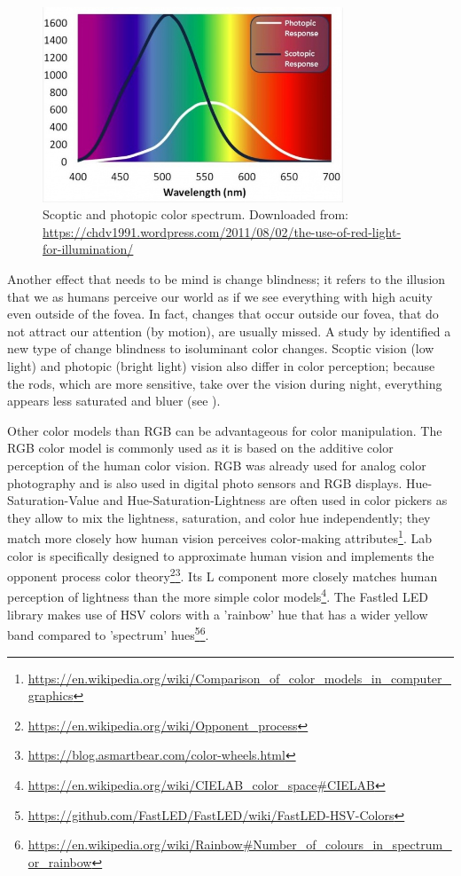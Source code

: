 \begin{figure}
    \includegraphics[width=0.8\textwidth]{fig/scoptic.jpg}
    \caption[Color spectrum]{Scoptic and photopic color spectrum. Downloaded from: \url{https://chdv1991.wordpress.com/2011/08/02/the-use-of-red-light-for-illumination/}}
    \label{fig:spectrum}
\end{figure}
Another effect that needs to be mind is change blindness; it refers to the illusion that we as humans perceive our world as if we see everything with high acuity even outside of the fovea. In fact, changes that occur outside our fovea, that do not attract our attention (by motion), are usually missed. A study by \citet{Goddard2013AScale} identified a new type of change blindness to isoluminant color changes. Scoptic vision (low light) and photopic (bright light) vision also differ in color perception; because the rods, which are more sensitive, take over the vision during night, everything appears less saturated and bluer (see \emph{}).

Other color models than RGB can be advantageous for color manipulation. The RGB color model is commonly used as it is based on the additive color perception of the human color vision. RGB was already used for analog color photography and is also used in digital photo sensors and RGB displays. Hue-Saturation-Value and Hue-Saturation-Lightness are often used in color pickers as they allow to mix the lightness, saturation, and color hue independently; they match more closely how human vision perceives color-making attributes\footnote{\url{https://en.wikipedia.org/wiki/Comparison_of_color_models_in_computer_graphics}}. Lab color is specifically designed to approximate human vision and implements the  opponent process color theory\footnote{\url{https://en.wikipedia.org/wiki/Opponent_process}}\fnsep\footnote{\url{https://blog.asmartbear.com/color-wheels.html}}. Its L component more closely matches human perception of lightness than the more simple color models\footnote{\url{https://en.wikipedia.org/wiki/CIELAB_color_space\#CIELAB}}. The Fastled LED library makes use of HSV colors with a 'rainbow' hue that has a wider yellow band compared to 'spectrum' hues\footnote{\url{https://github.com/FastLED/FastLED/wiki/FastLED-HSV-Colors}}\fnsep\footnote{\url{https://en.wikipedia.org/wiki/Rainbow\#Number_of_colours_in_spectrum_or_rainbow}}.  


